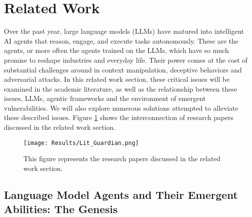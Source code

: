 \section{Related Work}
Over the past year, large language models (LLMs) have matured into intelligent AI agents that reason, engage, and execute tasks autonomously. These are the agents, or more often the agents trained on the LLMs, which have so much promise to reshape industries and everyday life. Their power comes at the cost of substantial challenges around in context manipulation, deceptive behaviors and adversarial attacks. In this related work section, these critical issues will be examined in the academic literature, as well as the relationship between these issues, LLMs, agentic frameworks and the environment of emergent vulnerabilities. We will also explore numerous solutions attempted to alleviate these described issues. Figure \ref{fig:Research_Network}
shows the interconnection of research papers discussed in the related work section. 


\begin{figure}[ht]
\centering
\texttt{[image: Results/Lit\_Guardian.png]}
\caption{This figure represents the research papers discussed in the related work section.}
\label{fig:Research_Network}
\end{figure}

 
\subsection{Language Model Agents and Their Emergent Abilities: The Genesis}

